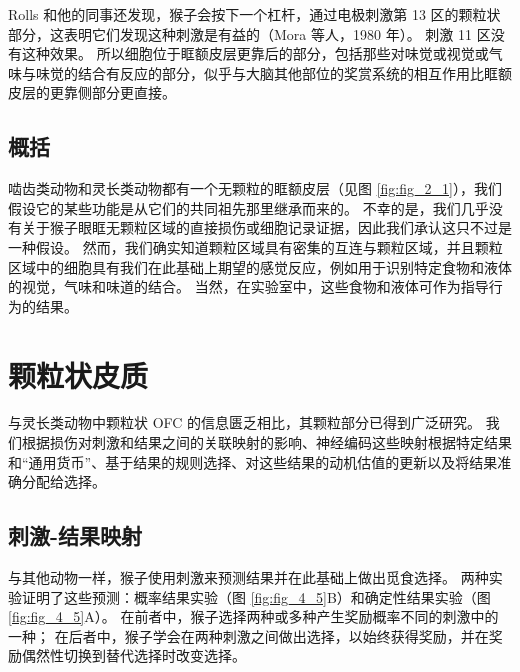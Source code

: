 Rolls 和他的同事还发现，猴子会按下一个杠杆，通过电极刺激第 13 区的颗粒状部分，这表明它们发现这种刺激是有益的（Mora 等人，1980 年）。
刺激 11 区没有这种效果。
所以细胞位于眶额皮层更靠后的部分，包括那些对味觉或视觉或气味与味觉的结合有反应的部分，似乎与大脑其他部位的奖赏系统的相互作用比眶额皮层的更靠侧部分更直接。\par



\subsection{概括}

啮齿类动物和灵长类动物都有一个无颗粒的眶额皮层（见图 \ref{fig:fig_2_1}），我们假设它的某些功能是从它们的共同祖先那里继承而来的。
不幸的是，我们几乎没有关于猴子眼眶无颗粒区域的直接损伤或细胞记录证据，因此我们承认这只不过是一种假设。
然而，我们确实知道颗粒区域具有密集的互连与颗粒区域，并且颗粒区域中的细胞具有我们在此基础上期望的感觉反应，例如用于识别特定食物和液体的视觉，气味和味道的结合。
当然，在实验室中，这些食物和液体可作为指导行为的结果。\par



\section{颗粒状皮质}

与灵长类动物中颗粒状 OFC 的信息匮乏相比，其颗粒部分已得到广泛研究。
我们根据损伤对刺激和结果之间的关联映射的影响、神经编码这些映射根据特定结果和“通用货币”、基于结果的规则选择、对这些结果的动机估值的更新以及将结果准确分配给选择。



\subsection{刺激-结果映射}

与其他动物一样，猴子使用刺激来预测结果并在此基础上做出觅食选择。
两种实验证明了这些预测：概率结果实验（图 \ref{fig:fig_4_5}B）和确定性结果实验（图 \ref{fig:fig_4_5}A）。
在前者中，猴子选择两种或多种产生奖励概率不同的刺激中的一种；
在后者中，猴子学会在两种刺激之间做出选择，以始终获得奖励，并在奖励偶然性切换到替代选择时改变选择。\par


